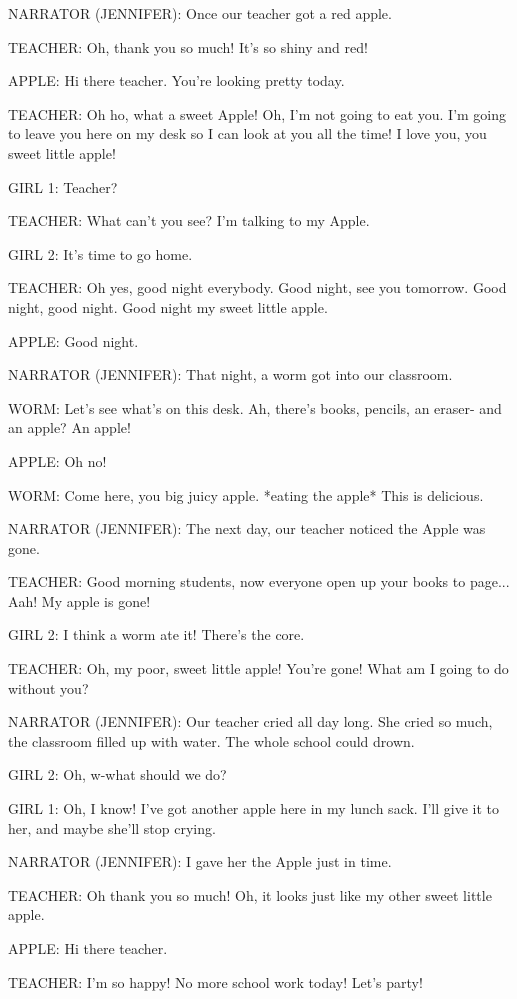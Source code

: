 NARRATOR (JENNIFER):
Once our teacher got a red apple.

TEACHER:
Oh, thank you so much!
It's so shiny and red!

APPLE:
Hi there teacher.
You're looking pretty today.

TEACHER:
Oh ho, what a sweet Apple!
Oh, I'm not going to eat you.
I'm going to leave you here on my desk so I can look at you all the time!
I love you, you sweet little apple!

GIRL 1:
Teacher?

TEACHER:
What can't you see?
I'm talking to my Apple.

GIRL 2:
It's time to go home.

TEACHER:
Oh yes, good night everybody.
Good night, see you tomorrow.
Good night, good night.
Good night my sweet little apple.

APPLE:
Good night.

NARRATOR (JENNIFER):
That night, a worm got into our classroom.

WORM:
Let's see what's on this desk.
Ah, there's books, pencils, an eraser- and an apple?
An apple!

APPLE:
Oh no!

WORM:
Come here, you big juicy apple.
*eating the apple*
This is delicious.

NARRATOR (JENNIFER):
The next day, our teacher noticed the Apple was gone.

TEACHER:
Good morning students, now everyone open up your books to page...
Aah!
My apple is gone!

GIRL 2:
I think a worm ate it!
There's the core.

TEACHER:
Oh, my poor, sweet little apple!
You're gone!
What am I going to do without you?

NARRATOR (JENNIFER):
Our teacher cried all day long.
She cried so much, the classroom filled up with water.
The whole school could drown.

GIRL 2:
Oh, w-what should we do?

GIRL 1:
Oh, I know!
I've got another apple here in my lunch sack.
I'll give it to her, and maybe she'll stop crying.

NARRATOR (JENNIFER):
I gave her the Apple just in time.

TEACHER:
Oh thank you so much!
Oh, it looks just like my other sweet little apple.

APPLE:
Hi there teacher.

TEACHER:
I'm so happy!
No more school work today!
Let's party!

